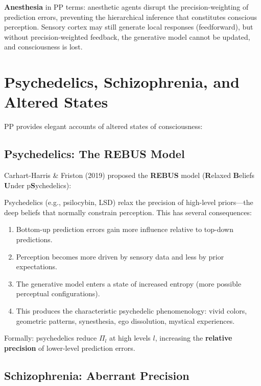 \documentclass[11pt,a4paper]{report}
\begin{document}
\textbf{Anesthesia} in PP terms: anesthetic agents disrupt the precision-weighting of prediction errors, preventing the hierarchical inference that constitutes conscious perception. Sensory cortex may still generate local responses (feedforward), but without precision-weighted feedback, the generative model cannot be updated, and consciousness is lost.

\section{Psychedelics, Schizophrenia, and Altered States}

PP provides elegant accounts of altered states of consciousness:

\subsection{Psychedelics: The REBUS Model}

Carhart-Harris \& Friston (2019) proposed the \textbf{REBUS} model (\textbf{R}elaxed \textbf{B}eliefs \textbf{U}nder p\textbf{S}ychedelics):

\begin{predbox}
Psychedelics (e.g., psilocybin, LSD) relax the precision of high-level priors---the deep beliefs that normally constrain perception. This has several consequences:
\begin{enumerate}[leftmargin=1.5em]
  \item Bottom-up prediction errors gain more influence relative to top-down predictions.
  \item Perception becomes more driven by sensory data and less by prior expectations.
  \item The generative model enters a state of increased entropy (more possible perceptual configurations).
  \item This produces the characteristic psychedelic phenomenology: vivid colors, geometric patterns, synesthesia, ego dissolution, mystical experiences.
\end{enumerate}
Formally: psychedelics reduce $\Pi_l$ at high levels $l$, increasing the \textbf{relative precision} of lower-level prediction errors.
\end{predbox}

\subsection{Schizophrenia: Aberrant Precision}
\end{document}
